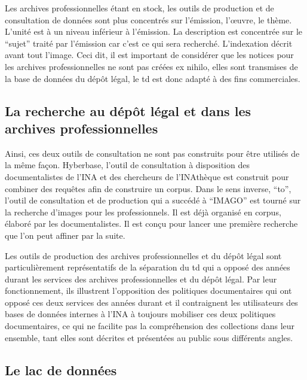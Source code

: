 
Les archives professionnelles étant en stock, les outils de production et de consultation de données sont plus concentrés sur l'émission, l’œuvre, le thème. L'unité est à un niveau inférieur à l'émission. La description est concentrée sur le \enquote{sujet} traité par l'émission car c'est ce qui sera recherché. L'indexation décrit avant tout l'image. Ceci dit, il est important de considérer que les notices pour les archives professionnelles ne sont pas créées ex nihilo, elles sont transmises de la base de données du dépôt légal, le \gls{td} est donc adapté à des fins commerciales. 

\subsection{La recherche au dépôt légal et dans les archives professionnelles}

Ainsi, ces deux outils de consultation ne sont pas construits pour être utilisés de la même façon. Hyberbase, l'outil de consultation à disposition des documentalistes de l'INA et des chercheurs de l'INAthèque est construit pour combiner des requêtes afin de construire un corpus. Dans le sens inverse, \enquote{\gls{to}}, l'outil de consultation et de production qui a succédé à \enquote{IMAGO} est tourné sur la recherche d'images pour les professionnels. Il est déjà organisé en corpus, élaboré par les documentalistes. Il est conçu pour lancer une première recherche que l'on peut affiner par la suite. 

Les outils de production des archives professionnelles et du dépôt légal sont particulièrement représentatifs de la séparation du \gls{td} qui a opposé des années durant les services des archives professionnelles et du dépôt légal. Par leur fonctionnement, ils illustrent l'opposition des politiques documentaires qui ont opposé ces deux services des années durant et il contraignent les utilisateurs des bases de données internes à l'INA à toujours mobiliser ces deux politiques documentaires, ce qui ne facilite pas la compréhension des collections dans leur ensemble, tant elles sont décrites et présentées au public sous différents angles. 

\subsection{Le lac de données}

